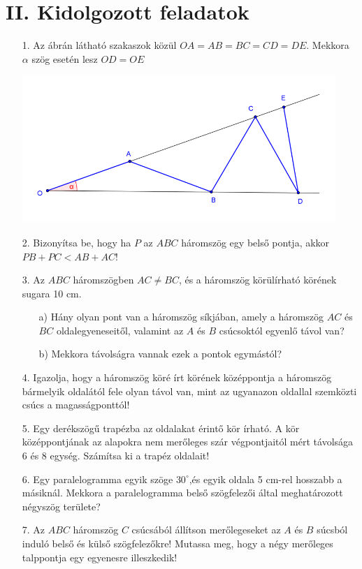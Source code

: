 \documentclass[a4paper,11pt]{article}
\begin{document}
\section*{II. Kidolgozott feladatok}
\begin{enumerate}
\item[1.\quad] Az ábrán látható szakaszok közül $O A = AB = BC = CD = DE$. Mekkora $\alpha$ szög esetén lesz $O D = O E$
\begin{center}
\includegraphics[scale=1]{1.png}
\end{center}
\item[2.\quad] Bizonyítsa be, hogy ha $P$ az $ABC$ háromszög egy belső pontja, akkor $PB + PC < AB + AC$!
\item[3.\quad] Az $ABC$ háromszögben $AC \neq BC$, és a háromszög körülírható körének sugara 10 cm.
\begin{enumerate}[left=2.5em]
\item[a)] Hány olyan pont van a háromszög síkjában, amely a háromszög $AC$ és $BC$ oldalegyeneseitől, valamint az $A$ és $B$ csúcsoktól egyenlő távol van? 
\item[b)] Mekkora távolságra vannak ezek a pontok egymástól?
\end{enumerate}
\item[4.\quad] Igazolja, hogy a háromszög köré írt körének középpontja a háromszög bármelyik oldalától fele olyan távol van, mint az ugyanazon oldallal szemközti csúcs a magasságponttól!
\item[5.\quad] Egy derékszögű trapézba az oldalakat érintő kör írható. A kör középpontjának az alapokra nem merőleges szár végpontjaitól mért távolsága 6 és 8 egység. Számítsa ki a trapéz oldalait!
\item[6.\quad] Egy paralelogramma egyik szöge $30^\circ$,és egyik oldala 5 cm-rel hosszabb a másiknál. Mekkora a paralelogramma belső szögfelezői által meghatározott négyszög területe?
\item[7.\quad] Az $ABC$ háromszög $C$ csúcsából állítson merőlegeseket az $A$ és $B$ súcsból induló belső és külső szögfelezőkre! Mutassa meg, hogy a négy merőleges talppontja egy egyenesre illeszkedik!

\end{enumerate}
\end{document}
